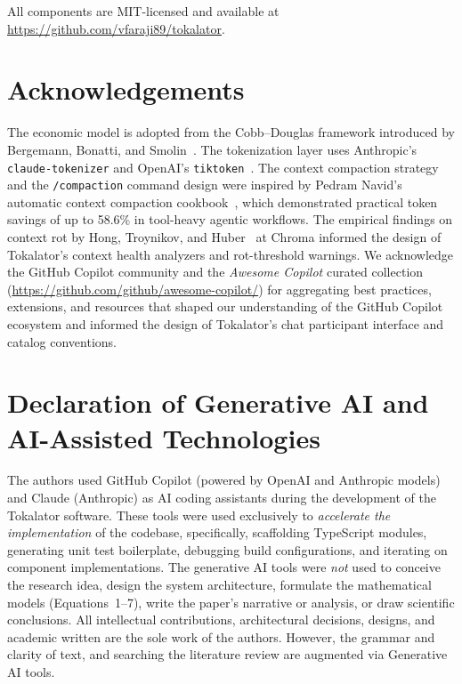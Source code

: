 \documentclass[a4paper,fleqn]{cas-dc}
\begin{document}
All components are MIT-licensed and available at \url{https://github.com/vfaraji89/tokalator}.


\section*{Acknowledgements}

The economic model is adopted from the Cobb--Douglas framework introduced by Bergemann, Bonatti, and Smolin~\cite{bergemann2025economics}.
The tokenization layer uses Anthropic's \texttt{claude-tokenizer} and OpenAI's \texttt{tiktoken}~\cite{sennrich2016bpe}.
The context compaction strategy and the \texttt{/compaction} command design were inspired by Pedram Navid's automatic context compaction cookbook~\cite{navid2025compaction}, which demonstrated practical token savings of up to 58.6\% in tool-heavy agentic workflows.
The empirical findings on context rot by Hong, Troynikov, and Huber~\cite{hong2025contextrot} at Chroma informed the design of Tokalator's context health analyzers and rot-threshold warnings.
We acknowledge the GitHub Copilot community and the \textit{Awesome Copilot} curated collection (\url{https://github.com/github/awesome-copilot/}) for aggregating best practices, extensions, and resources that shaped our understanding of the GitHub Copilot ecosystem and informed the design of Tokalator's chat participant interface and catalog conventions.


\section*{Declaration of Generative AI and AI-Assisted Technologies}

The authors used GitHub Copilot (powered by OpenAI and Anthropic models) and Claude (Anthropic) as AI coding assistants during the development of the Tokalator software. These tools were used exclusively to \textit{accelerate the implementation} of the codebase, specifically, scaffolding TypeScript modules, generating unit test boilerplate, debugging build configurations, and iterating on component implementations. The generative AI tools were \textit{not} used to conceive the research idea, design the system architecture, formulate the mathematical models (Equations~1--7), write the paper's narrative or analysis, or draw scientific conclusions. All intellectual contributions, architectural decisions, designs, and academic written are the sole work of the authors. However, the grammar and clarity of text, and searching the literature review are augmented via Generative AI tools.
\end{document}
